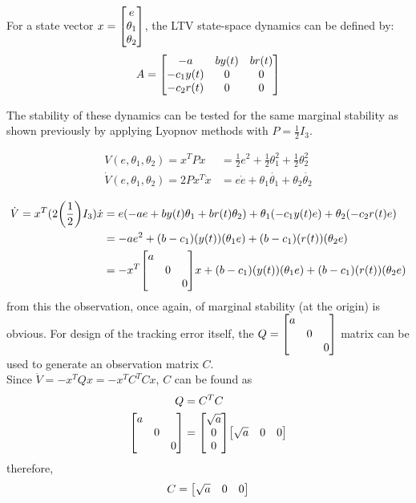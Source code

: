 \documentclass[letter]{article}
\begin{document}
For a state vector $x = \mqty[e \\ \theta_1 \\ \theta_2]$, the LTV state-space dynamics can be defined by:
\begin{equation}
	A = \mqty[-a & b y(t) & b r(t)\\
			  -c_1 y(t) & 0 &0\\
			  -c_2 r(t) & 0 &0]
\end{equation}

The stability of these dynamics can be tested for the same marginal stability as shown previously by applying Lyopnov methods with $P=\frac{1}{2} I_3$.

\begin{align}
	V(e, \theta_1, \theta_2) = x^T P x
	&= \frac{1}{2} e^2 + \frac{1}{2} \theta_1^2 + \frac{1}{2} \theta_2^2\\
	\dot{V}(e, \theta_1, \theta_2) = 2 P x^T \dot{x}
	&= e \dot{e} + \theta_1 \dot{\theta_1} + \theta_2 \dot{\theta_2}\\
\end{align}
\begin{align}
	\dot{V} = x^T (2 \qty(\frac{1}{2}) I_3)\dot{x}
	&= e \qty(-a e + b y(t) \theta_1 + b r(t) \theta_2)
	+ \theta_1 (- c_1 y(t) e)
	+ \theta_2 (- c_2 r(t) e)\\
	&= -a e^2 + (b-c_1) (y(t)) (\theta_1 e) + (b - c_1) (r(t)) (\theta_2 e)\\
	&= - x^T \mqty[\dmat{a,0,0}] x + (b-c_1) (y(t)) (\theta_1 e) + (b - c_1) (r(t)) (\theta_2 e)
\end{align}
from this the observation, once again, of marginal stability (at the origin) is obvious. For design of the tracking error itself, the $Q = \mqty[\dmat{a,0,0}]$ matrix can be used to generate an observation matrix $C$.\\

Since $\dot{V} = -x^T Q x = -x^T C^T C x$, $C$ can be found as
\begin{align}
	Q &= C^T C\\
	\mqty[\dmat{a,0,0}] &= \mqty[\sqrt{a}\\0\\0] \mqty[\sqrt{a}&0&0]
\end{align}
therefore,
\begin{equation}
	C = \mqty[\sqrt{a} & 0 & 0]
\end{equation}
\end{document}

